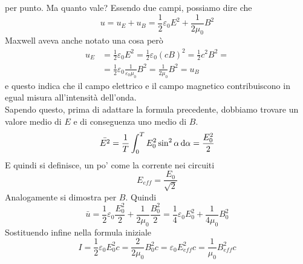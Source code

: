 per punto. Ma quanto vale? Essendo due campi, possiamo dire che
\begin{equation*}
  u = u_E + u_B = \frac{1}{2}\varepsilon_0E^2+\frac{1}{2\mu_0}B^2
\end{equation*}
Maxwell aveva anche notato una cosa però
\begin{align*}
  u_E &= \frac{1}{2}\varepsilon_0E^2=\frac{1}{2}\varepsilon_0(cB)^2=\frac{1}{2}c^2B^2=\\
      &= \frac{1}{2}\varepsilon_0 \frac{1}{\varepsilon_0\mu_0}B^2= \frac{1}{2\mu_0}B^2=u_B
\end{align*}
e questo indica che il campo elettrico e il campo magnetico contribuiscono in egual misura
all'intensità dell'onda.\\
Sapendo questo, prima di adattare la formula precedente, dobbiamo trovare un valore medio di $E$
e di conseguenza uno medio di $B$.
\begin{equation*}
  \bar{E^2}=\frac{1}{T}\int_0^T E_0^2\sin^2\alpha\mathop{}\!\mathrm{d}\alpha=\frac{E_0^2}{2}
\end{equation*}
E quindi si definisce, un po' come la corrente nei circuiti
\begin{equation*}
  E_{eff} = \frac{E_0}{\sqrt{2}}
\end{equation*}
Analogamente si dimostra per $B$. Quindi
\begin{equation*}
  \bar{u}=\frac{1}{2}\varepsilon_0 \frac{E_0^2}{2}+\frac{1}{2\mu_0}\frac{B_0^2}{2}=
  \frac{1}{4}\varepsilon_0E_0^2+\frac{1}{4\mu_0}B_0^2
\end{equation*}
Sostituendo infine nella formula iniziale
\begin{equation*}
  I=\frac{1}{2}\varepsilon_0E_0^2c=\frac{2}{2\mu_0}B_0^2c=\varepsilon_0E_{eff}^2c=\frac{1}{\mu_0}
  B_{eff}^2c
\end{equation*}
